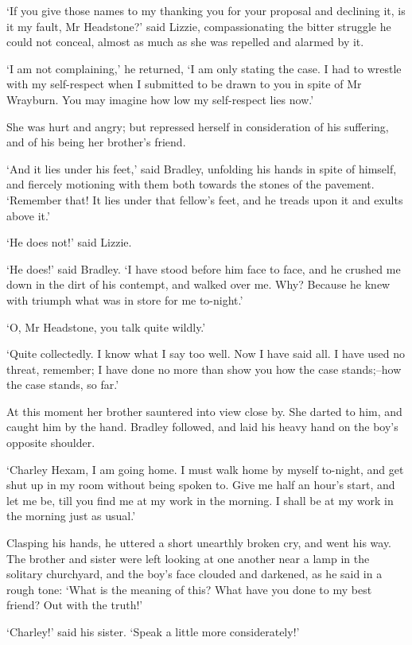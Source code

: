 ‘If you give those names to my thanking you for your proposal
and declining it, is it my fault, Mr Headstone?’ said Lizzie,
compassionating the bitter struggle he could not conceal, almost as much
as she was repelled and alarmed by it.

‘I am not complaining,’ he returned, ‘I am only stating the case. I had
to wrestle with my self-respect when I submitted to be drawn to you in
spite of Mr Wrayburn. You may imagine how low my self-respect lies now.’

She was hurt and angry; but repressed herself in consideration of his
suffering, and of his being her brother’s friend.

‘And it lies under his feet,’ said Bradley, unfolding his hands in spite
of himself, and fiercely motioning with them both towards the stones of
the pavement. ‘Remember that! It lies under that fellow’s feet, and he
treads upon it and exults above it.’

‘He does not!’ said Lizzie.

‘He does!’ said Bradley. ‘I have stood before him face to face, and he
crushed me down in the dirt of his contempt, and walked over me. Why?
Because he knew with triumph what was in store for me to-night.’

‘O, Mr Headstone, you talk quite wildly.’

‘Quite collectedly. I know what I say too well. Now I have said all. I
have used no threat, remember; I have done no more than show you how the
case stands;--how the case stands, so far.’

At this moment her brother sauntered into view close by. She darted to
him, and caught him by the hand. Bradley followed, and laid his heavy
hand on the boy’s opposite shoulder.

‘Charley Hexam, I am going home. I must walk home by myself to-night,
and get shut up in my room without being spoken to. Give me half an
hour’s start, and let me be, till you find me at my work in the morning.
I shall be at my work in the morning just as usual.’

Clasping his hands, he uttered a short unearthly broken cry, and went
his way. The brother and sister were left looking at one another near
a lamp in the solitary churchyard, and the boy’s face clouded and
darkened, as he said in a rough tone: ‘What is the meaning of this? What
have you done to my best friend? Out with the truth!’

‘Charley!’ said his sister. ‘Speak a little more considerately!’

